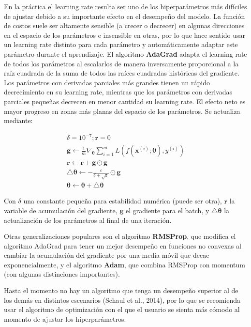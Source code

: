 En la pr\'actica el learning rate resulta ser uno de los hiperpar\'ametros m\'as dif\'iciles de ajustar debido a su importante efecto en el desempe{\~{n}}o del modelo. La funci\'on de costos suele ser altamente sensible (a crecer o decrecer) en algunas direcciones en el espacio de los par\'ametros e insensible en otras, por lo que hace sentido usar un learning rate distinto para cada par\'ametro y autom\'aticamente adaptar este par\'ametro durante el aprendizaje. El algoritmo \textbf{AdaGrad} adapta el learning rate de todos los par\'ametros al escalarlos de manera inversamente proporcional a la ra\'iz cuadrada de la suma de todos las ra\'ices cuadradas hist\'oricas del gradiente. Los par\'ametros con derivadas parciales m\'as grandes tienen un r\'apido decrecimiento en su learning rate, mientras que los par\'ametros con derivadas parciales peque{\~{n}}as decrecen en menor cantidad su learning rate. El efecto neto es mayor progreso en zonas m\'as planas del espacio de los par\'ametros. Se actualiza mediante:

\begin{gather*}
\delta = 10^{-7}; \bm{r} = 0\\
\bm{g} \longleftarrow \frac{1}{m}\nabla_{\bm{\theta}}\sum_{i=1}^{m}L(f(\bm{x}^{(i)};\bm{\theta}),y^{(i)})\\
\bm{r} \longleftarrow \bm{r} + \bm{g}\odot \bm{g}\\
\bigtriangleup\bm{\theta} \longleftarrow -\frac{\epsilon}{\delta+\sqrt{\bm{r}}}\odot \bm{g}\\
\bm{\theta} \longleftarrow \bm{\theta}+\bigtriangleup\bm{\theta}
\end{gather*}

Con $\delta$ una constante peque{\~{n}}a para estabilidad num\'erica (puede ser otra), $\bm{r}$ la variable de acumulaci\'on del gradiente, $\bm{g}$ el gradiente para el batch, y $\bigtriangleup\bm{\theta}$ la actualizaci\'on de los par\'ametros al final de una iteraci\'on.

Otras generalizaciones populares son el algoritmo \textbf{RMSProp}, que modifica el algoritmo AdaGrad para tener un mejor desempe{\~{n}}o en funciones no convexas al cambiar la acumulaci\'on del gradiente por una media m\'ovil que decae exponencialmente, y el algoritmo \textbf{Adam}, que combina RMSProp con momentum (con algunas distinciones importantes).

Hasta el momento no hay un algoritmo que tenga un desempe{\~{n}}o superior al de los dem\'as en distintos escenarios (Schaul et al., 2014), por lo que se recomienda usar el algoritmo de optimizaci\'on con el que el usuario se sienta m\'as c\'omodo al momento de ajustar los hiperpar\'ametros.

